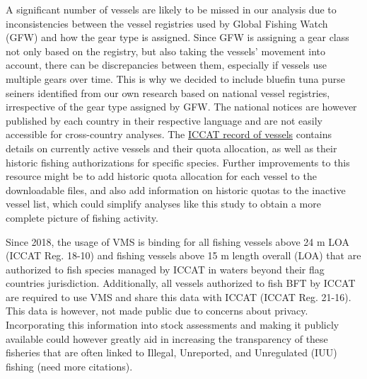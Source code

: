 \medskip

A significant number of vessels are likely to be missed in our analysis due to inconsistencies
between the vessel registries used by Global Fishing Watch (GFW) and how the gear type is assigned.
Since GFW is assigning a gear class not only based on the registry, but also taking the vessels'
movement into account, there can be discrepancies between them, especially if vessels use multiple
gears over time. This is why we decided to include bluefin tuna purse seiners identified from our
own research based on national vessel registries, irrespective of the gear type assigned by GFW\@.
The national notices are however published by each country in their respective language and are not
easily accessible for cross-country analyses. The
\href{https://www.iccat.int/en/VesselsRecord.asp}{ICCAT record of vessels} contains details on
currently active vessels and their quota allocation, as well as their historic fishing
authorizations for specific species. Further improvements to this resource might be to add historic
quota allocation for each vessel to the downloadable files, and also add information on historic
quotas to the inactive vessel list, which could simplify analyses like this study to obtain a more
complete picture of fishing activity.

\medskip

Since 2018, the usage of VMS is binding for all fishing vessels above 24 m LOA (ICCAT Reg. 18-10)
and fishing vessels above 15 m length overall (LOA) that are authorized to fish species managed by
ICCAT in waters beyond their flag countries jurisdiction. Additionally, all vessels authorized to
fish BFT by ICCAT are required to use VMS and share this data with ICCAT (ICCAT Reg. 21-16). This
data is however, not made public due to concerns about privacy. Incorporating this information into
stock assessments and making it publicly available could however greatly aid in increasing the
transparency of these fisheries that are often linked to Illegal, Unreported, and Unregulated (IUU)
fishing \citep{iccat_bft_summary} (need more citations).

